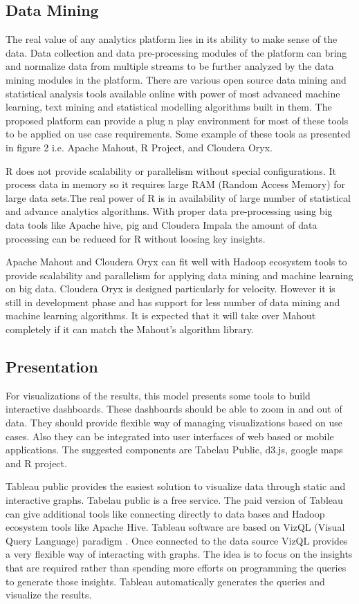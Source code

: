 \subsection{Data Mining}
The real value of any analytics platform lies in its ability to make sense of the data. Data collection and data pre-processing modules of the platform can bring and normalize data from multiple streams to be further analyzed by the data mining modules in the platform. There are various open source data mining and statistical analysis tools available online with power of most advanced machine learning, text mining and statistical modelling algorithms built in them.  The proposed platform can provide a plug n play environment for most of these tools to be applied on use case requirements. Some example of these tools as presented in figure 2 i.e. Apache Mahout, R Project, and Cloudera Oryx. 

R does not provide scalability or parallelism without special configurations. It process data in memory so it requires large RAM (Random Access Memory) for large data sets.The real power of R is in availability of large number of statistical and advance analytics algorithms. With proper data pre-processing using big data tools like Apache hive, pig and Cloudera Impala the amount of data processing can be reduced for R without loosing key insights.

 Apache Mahout and Cloudera Oryx can fit well with Hadoop ecosystem tools to provide scalability and parallelism for applying data mining and machine learning on big data. Cloudera Oryx is designed particularly for velocity. However it is still in development phase and has support for less number of data mining and machine learning algorithms. It is expected that it will take over Mahout completely if it can match the Mahout's algorithm library.  
\subsection{Presentation}  
For visualizations of the results, this model presents some tools to build interactive dashboards. These dashboards should be able to zoom in and out of data. They should provide flexible way of managing visualizations based on use cases. Also they can be integrated into user interfaces of web based or mobile applications. The suggested components are Tabelau Public, d3.js, google maps and R project.

Tableau public provides the easiest solution to visualize data through static and interactive graphs. Tabelau public is a free service. The paid version of Tableau can give additional tools like connecting directly to data bases and Hadoop ecosystem tools like Apache Hive. Tableau software are based on VizQL (Visual Query Language) paradigm \cite{hanrahan2006vizql}. Once connected to the data source VizQL  provides a very flexible way of interacting with graphs. The idea is to focus on the insights that are required rather than spending more efforts on programming the queries to generate those insights. Tableau automatically generates the queries and visualize the results.


